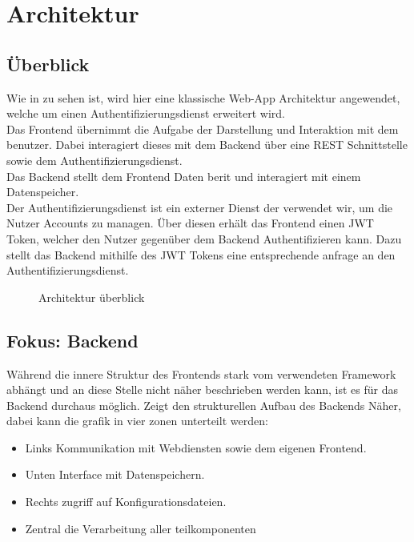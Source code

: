 \chapter{Architektur}\label{ch:architektur}

\section{Überblick}\label{sec:uberblick}
Wie in  zu sehen ist, wird hier eine klassische Web-App Architektur angewendet,
welche um einen Authentifizierungsdienst erweitert wird.\\
Das Frontend übernimmt die Aufgabe der Darstellung und Interaktion mit dem benutzer.
Dabei interagiert dieses mit dem Backend über eine \ac{REST} Schnittstelle sowie dem Authentifizierungsdienst.\\
Das Backend stellt dem Frontend Daten berit und interagiert mit einem Datenspeicher.\\
Der Authentifizierungsdienst ist ein externer Dienst der verwendet wir, um die Nutzer Accounts zu managen.
Über diesen erhält das Frontend einen \ac{JWT} Token, welcher den Nutzer gegenüber dem Backend Authentifizieren kann.
Dazu stellt das Backend mithilfe des \ac{JWT} Tokens eine entsprechende anfrage an den Authentifizierungsdienst.

\begin{figure}[h]
    
    \caption{Architektur überblick}\label{fig:HighLevelArch}
\end{figure}

\section{Fokus: Backend}\label{sec:fokus:-backend}

Während die innere Struktur des Frontends stark vom verwendeten Framework abhängt und an diese Stelle nicht näher beschrieben werden kann,
ist es für das Backend durchaus möglich.
 Zeigt den strukturellen Aufbau des Backends Näher, dabei kann die grafik in vier zonen unterteilt werden:
\begin{itemize}
    \item Links Kommunikation mit Webdiensten sowie dem eigenen Frontend.
    \item Unten Interface mit Datenspeichern.
    \item Rechts zugriff auf Konfigurationsdateien.
    \item Zentral die Verarbeitung aller teilkomponenten
\end{itemize}

